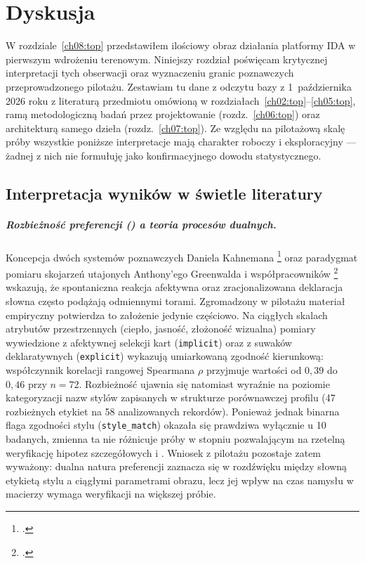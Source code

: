 \chapter{Dyskusja}
\label{ch09:top}

W rozdziale~\ref{ch08:top} przedstawiłem ilościowy obraz działania platformy IDA w pierwszym wdrożeniu terenowym. Niniejszy rozdział poświęcam krytycznej interpretacji tych obserwacji oraz wyznaczeniu granic poznawczych przeprowadzonego pilotażu. Zestawiam tu dane z odczytu bazy z 1~października 2026 roku z literaturą przedmiotu omówioną w rozdziałach~\ref{ch02:top}--\ref{ch05:top}, ramą metodologiczną badań przez projektowanie (rozdz.~\ref{ch06:top}) oraz architekturą samego dzieła (rozdz.~\ref{ch07:top}). Ze względu na pilotażową skalę próby wszystkie poniższe interpretacje mają charakter roboczy i eksploracyjny --- żadnej z nich nie formułuję jako konfirmacyjnego dowodu statystycznego.

\section{Interpretacja wyników w świetle literatury}
\label{ch09:sec:interpretacja}

\paragraph{Rozbieżność preferencji () a teoria procesów dualnych.}
Koncepcja dwóch systemów poznawczych Daniela Kahnemana \footcite{kahneman2011thinking} oraz paradygmat pomiaru skojarzeń utajonych Anthony'ego Greenwalda i współpracowników \footcite{greenwald1998iat} wskazują, że spontaniczna reakcja afektywna oraz zracjonalizowana deklaracja słowna często podążają odmiennymi torami. Zgromadzony w pilotażu materiał empiryczny potwierdza to założenie jedynie częściowo. Na ciągłych skalach atrybutów przestrzennych (ciepło, jasność, złożoność wizualna) pomiary wywiedzione z afektywnej selekcji kart (\texttt{implicit}) oraz z suwaków deklaratywnych (\texttt{explicit}) wykazują umiarkowaną zgodność kierunkową: współczynnik korelacji rangowej Spearmana $\rho$ przyjmuje wartości od $0{,}39$ do $0{,}46$ przy $n=72$. Rozbieżność ujawnia się natomiast wyraźnie na poziomie kategoryzacji nazw stylów zapisanych w strukturze porównawczej profilu (47 rozbieżnych etykiet na 58 analizowanych rekordów). Ponieważ jednak binarna flaga zgodności stylu (\texttt{style\_match}) okazała się prawdziwa wyłącznie u 10 badanych, zmienna ta nie różnicuje próby w stopniu pozwalającym na rzetelną weryfikację hipotez szczegółowych  i . Wniosek z pilotażu pozostaje zatem wyważony: dualna natura preferencji zaznacza się w rozdźwięku między słowną etykietą stylu a ciągłymi parametrami obrazu, lecz jej wpływ na czas namysłu w macierzy wymaga weryfikacji na większej próbie.

